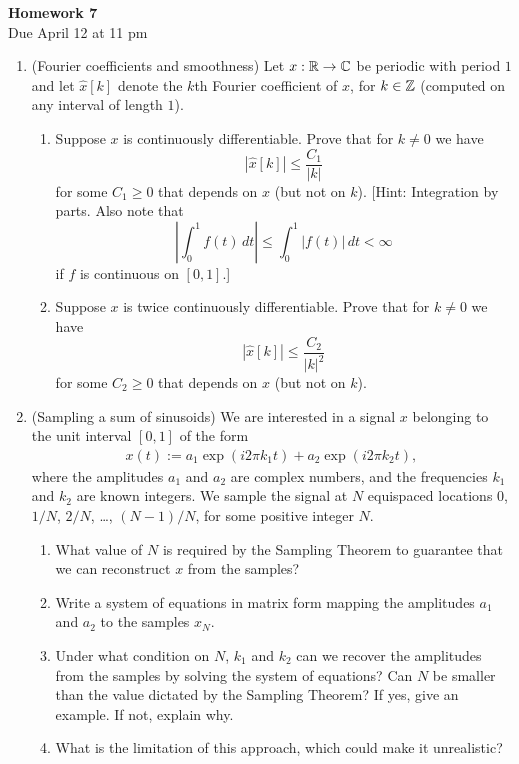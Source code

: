 \documentclass[12pt,twoside]{article}
\begin{document}
\begin{center}
{\large{\textbf{Homework 7}} } \vspace{0.2cm}\\
Due April 12 at 11 pm
\end{center}

\begin{enumerate}

\item (Fourier coefficients and smoothness) Let $x:\mathbb{R}\to\mathbb{C}$ be
  periodic with period $1$
  and let $\hat{x}[k]$ denote the $k$th Fourier coefficient of $x$,
  for $k\in\mathbb{Z}$ (computed on any interval of length $1$).
  \begin{enumerate}
  \item Suppose $x$ is continuously differentiable. Prove that for
    $k\neq 0$ we have
    $$|\hat{x}[k]| \leq \frac{C_1}{|k|}$$
    for some $C_1\geq0$ that depends on $x$ (but not on $k$). [Hint:
      Integration by parts.  Also note that
      $$\left|\int_0^1 f(t)\,dt\right| \leq \int_0^1 |f(t)|\,dt<\infty$$
    if $f$ is continuous on $[0,1]$.]
  \item Suppose $x$ is twice continuously differentiable.
    Prove that for $k\neq 0$ we have
    $$|\hat{x}[k]| \leq \frac{C_2}{|k|^2}$$
    for some $C_2\geq0$ that depends on $x$ (but not on $k$).
  \end{enumerate}
  
\item (Sampling a sum of sinusoids) We are interested in a signal $x$ belonging to the unit interval $[0,1]$ of the form
\begin{align}
x(t) := a_1 \exp (i 2 \pi k_1 t ) + a_2 \exp (i 2 \pi k_2 t ),
\end{align}
where the amplitudes $a_1$ and $a_2$ are complex numbers, and the
frequencies $k_1$ and $k_2$ are known integers.
We sample the signal at $N$ equispaced locations $0$, $1/N$, $2/N$,
\ldots, $(N-1)/N$, for some positive integer $N$.  
\begin{enumerate}
\item What value of $N$ is required by the Sampling Theorem to
  guarantee that we can reconstruct $x$ from the samples? 
\item Write a system of equations in matrix form mapping the
  amplitudes $a_1$ and $a_2$ to the samples $x_{N}$. 
  \item Under what condition on $N$, $k_1$ and $k_2$ can we recover the
  amplitudes from the samples by solving the system of equations? 
  Can $N$ be smaller than the value dictated by the Sampling Theorem?
  If yes, give an example. If not, explain why.  
  \item What is the limitation of this approach, which could make it unrealistic?
\end{enumerate}
   

\end{enumerate}
\end{document}
